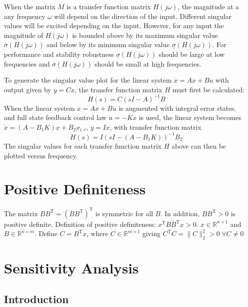 When the matrix $M$ is a transfer function matrix $H(j\omega)$, the magnitude at a any frequency $\omega$ will depend on the direction of the input.
Different singular values will be excited depending on the input.
However, for any input the magnitude of $H(j\omega)$ is bounded above by its maximum singular value $\overline{\sigma}(H(j\omega))$ and below by its minimum singular value $\underline{\sigma}(H(j\omega))$.
For performance and stability robustness $\underline{\sigma}(H(j\omega))$ should be large at low frequencies and $\overline{\sigma}(H(j\omega))$ should be small at high frequencies.

To generate the singular value plot for the linear system $\dot{x}=Ax+Bu$ with output given by $y=Cx$, the transfer function matrix $H$ must first be calculated:
\begin{equation*}
  H(s)=C(sI-A)^{-1}B
\end{equation*}
When the linear system $\dot{x}=Ax+Bu$ is augmented with integral error states, and full state feedback control law $u=-Kx$ is used, the linear system becomes $\dot{x}= (A-B_1K)x+B_2x_{i,r}$, $y=Ix$, with transfer function matrix
\begin{equation*}
  H(s)=I(sI-(A-B_{1}K))^{-1}B_{2}
\end{equation*}
The singular values for each transfer function matrix $H$ above can then be plotted versus frequency.

\section{Positive Definiteness}

The matrix $BB^{\text{T}}=(BB^{\text{T}})^{\text{T}}$ is symmetric for all $B$.
In addition, $BB^{\text{T}}>0$ is positive definite.
Definition of positive definiteness: $x^{\text{T}}BB^{\text{T}}x>0$.
$x\in\mathbb{R}^{n\times 1}$ and $B\in\mathbb{R}^{n\times m}$.
Define $C=B^{\text{T}}x$, where $C\in\mathbb{R}^{m\times1}$ giving $C^{\text{T}}C=\|C\|_{2}^{2}>0\;\forall C\neq0$

\section{Sensitivity Analysis}

\subsection{Introduction}


